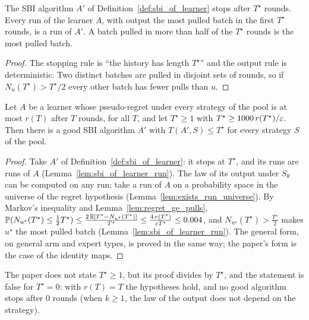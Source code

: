 \begin{lemma}
  \label{lem:sbi_of_learner_run}
  \leanok
  The SBI algorithm $A'$ of Definition~\ref{def:sbi_of_learner} stops after $T^\star$ rounds.
  Every run of the learner $A$, with output the most pulled batch in the first $T^\star$ rounds, is
  a run of $A'$. A batch pulled in more than half of the $T^\star$ rounds is the most pulled batch.
\end{lemma}

\begin{proof}
  \leanok
  The stopping rule is ``the history has length $T^\star$'' and the output rule is deterministic.
  Two distinct batches are pulled in disjoint sets of rounds, so if $N_u(T^\star) > T^\star/2$
  every other batch has fewer pulls than $u$.
\end{proof}

\begin{lemma}
  \label{lem:reduction}
  \leanok
  Let $A$ be a learner whose pseudo-regret under every strategy of the pool is at most $r(T)$ after
  $T$ rounds, for all $T$, and let $T^\star \ge 1$ with $T^\star \ge 1000\, r(T^\star)/\varepsilon$. Then
  there is a good SBI algorithm $A'$ with $T(A', S) \le T^\star$ for every strategy $S$ of the pool.
\end{lemma}

\begin{proof}
  \leanok
  Take $A'$ of Definition~\ref{def:sbi_of_learner}: it stops at $T^\star$, and its runs are runs of
  $A$ (Lemma~\ref{lem:sbi_of_learner_run}). The law of its output under $S_\theta$ can be computed
  on any run; take a run of $A$ on a probability space in the universe of the regret hypothesis
  (Lemma~\ref{lem:exists_run_universe}). By Markov's inequality and
  Lemma~\ref{lem:regret_ge_pulls},
  $\mathbb{P}(N_{u^\star}(T^\star) \le \frac12 T^\star)
  \le \frac{2\, \mathbb{E}[T^\star - N_{u^\star}(T^\star)]}{T^\star}
  \le \frac{4\, r(T^\star)}{\varepsilon T^\star} \le 0.004$, and $N_{u^\star}(T^\star) > \frac{T^\star}{2}$
  makes $u^\star$ the most pulled batch (Lemma~\ref{lem:sbi_of_learner_run}). The general form,
  on general arm and expert types, is proved in the same way; the paper's form is the case of the
  identity maps.
\end{proof}

\begin{remark}
  \label{rem:reduction_t_pos}
  The paper does not state $T^\star \ge 1$, but its proof divides by $T^\star$, and the statement
  is false for $T^\star = 0$: with $r(T) = T$ the hypotheses hold, and no good algorithm stops after
  $0$ rounds (when $k \ge 1$, the law of the output does not depend on the strategy).
\end{remark}
